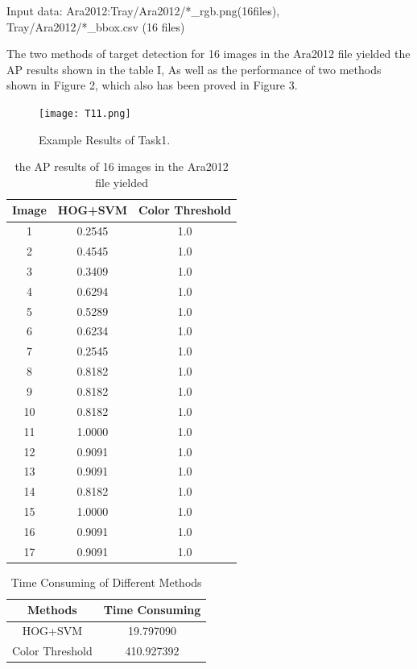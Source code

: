 \documentclass[conference]{IEEEtran}
\begin{document}
Input data: Ara2012:Tray/Ara2012/*\_rgb.png(16files),    \\ Tray/Ara2012/*\_bbox.csv (16 files)

The two methods of target detection for 16 images in the Ara2012 file yielded the AP results shown in the table I,
As well as the performance of two methods shown in Figure 2, which also has been proved in Figure 3.

\begin{figure}[htbp]
\centerline{\texttt{[image: T11.png]}}
\caption{Example Results of Task1.}
\label{fig2}
\end{figure}

\begin{table}[htbp]
\caption{ the AP results of 16 images in the Ara2012 file yielded}
\begin{center}
\begin{tabular}{|c|c|c|}

\hline
Image &HOG+SVM&Color Threshold \\
\hline
1&0.2545 &1.0 \\
\hline
2&0.4545 &1.0 \\
\hline
3&0.3409 &1.0 \\
\hline
4&0.6294 &1.0 \\
\hline
5&0.5289 &1.0 \\
\hline
6&0.6234 &1.0 \\
\hline
7&0.2545 &1.0 \\
\hline
8&0.8182 &1.0 \\
\hline
9&0.8182 &1.0 \\	
\hline
10&0.8182 &1.0 \\	
\hline
11&1.0000 &1.0 \\
\hline	
12&0.9091 &1.0 \\
\hline
13&0.9091 &1.0 \\	
\hline
14&0.8182 &1.0 \\	
\hline
15&1.0000 &1.0 \\	
\hline
16&0.9091 &1.0 \\
\hline
17&0.9091 &1.0 \\
\hline
\hline

\end{tabular}
\label{tab1}
\end{center}
\end{table}



\begin{table}[htbp]
\caption{Time Consuming of Different Methods}
\begin{center}
\begin{tabular}{|c|c|}

\hline
Methods &Time Consuming \\
\hline
HOG+SVM&19.797090  \\
\hline
Color Threshold&410.927392  \\
\hline

\end{tabular}
\label{tab2}
\end{center}
\end{table}
\end{document}
